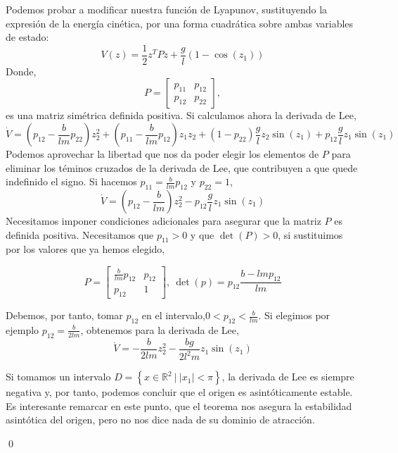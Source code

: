 \begin{example}
Podemos probar a modificar nuestra función de Lyapunov, sustituyendo la expresión de la energía cinética, por una forma cuadrática sobre ambas variables de estado:
\begin{equation*}
V(z) = \frac{1}{2} z^TPz+ \frac{g}{l}\left(1-\cos(z_1)\right)
\end{equation*}
Donde,
\begin{equation*}
P = \begin{bmatrix}
p_{11} & p_{12}\\ p_{12} & p_{22}
\end{bmatrix},
\end{equation*}
es una matriz simétrica definida positiva.
Si calculamos ahora la derivada de Lee,
\begin{equation*}
\dot V =\left(p_{12}-\frac{b}{lm}p_{22}\right)z_2^2+ \left(p_{11}-\frac{b}{lm}p_{12} \right) z_1z_2 + (1 -p_{22})\frac{g}{l} z_2\sin(z_1) + p_{12}\frac{g}{l} z_1\sin(z_1)
\end{equation*}
Podemos aprovechar la libertad que nos da poder elegir los elementos de $P$ para eliminar los téminos cruzados de la derivada de Lee, que contribuyen a que quede indefinido el signo. Si hacemos $p_{11} = \frac{b}{lm}p_{12}$ y $p_{22}=1$,
\begin{equation*}
\dot V =\left(p_{12}-\frac{b}{lm}\right)z_2^2-p_{12}\frac{g}{l} z_1\sin(z_1)
\end{equation*}
Necesitamos imponer condiciones adicionales  para asegurar que la matriz $P$ es definida positiva. Necesitamos que $p_{11}>0$ y que $\det(P)>0$, si sustituimos por los valores que ya hemos elegido,

\begin{equation*}
P =\begin{bmatrix}
\frac{b}{lm}p_{12} & p_{12}\\
p_{12} & 1
\end{bmatrix}, \ \det(p) = p_{12}\frac{b-lmp_{12}}{lm}
\end{equation*}

Debemos, por tanto, tomar $p_{12}$ en el intervalo,$0<p_{12}< \frac{b}{lm}$. Si elegimos por ejemplo $p_{12} =  \frac{b}{2lm}$, obtenemos para la derivada de Lee,
\begin{equation*}
\dot V =-\frac{b}{2lm}z_2^2-\frac{bg}{2l^2m}z_1 \sin(z_1)
\end{equation*}

Si tomamos un intervalo $D=\left\{x \in \mathbb{R}^2 \ | \ |x_1|<\pi \right\}$, la derivada de Lee es siempre negativa y, por tanto, podemos concluir que el origen es asintóticamente estable. Es interesante remarcar en este punto, que el teorema nos asegura la estabilidad asintótica del origen, pero no nos dice nada de su dominio de atracción.

\qed
\end{example}


